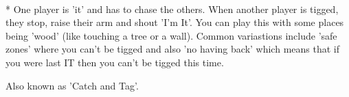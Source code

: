 \begin{minipage}{\textwidth}
\equip{}
\\*
One player is 'it' and has to chase the others.  When another player is tigged, they stop, raise their arm
and shout 'I'm It'. You can play this with some places being 'wood' (like touching a tree or a wall).  Common variastions include 'safe zones' where you can't be tigged and also 'no having back' which means that if you were last IT then you can't be tigged this time.

Also known as 'Catch and Tag'.
\end{minipage}    \vfill
